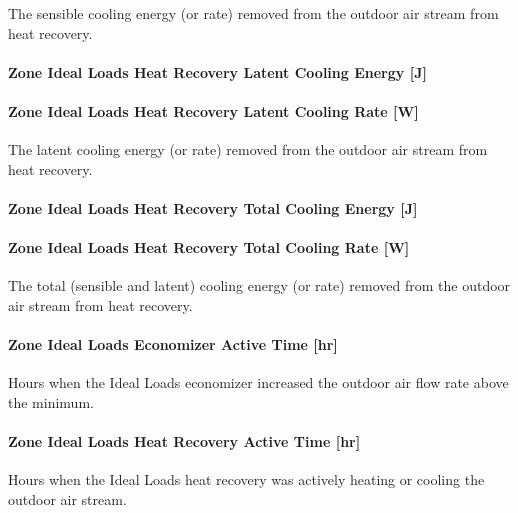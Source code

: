 The sensible cooling energy (or rate) removed from the outdoor air stream from heat recovery.

\paragraph{Zone Ideal Loads Heat Recovery Latent Cooling Energy {[}J{]}}\label{zone-ideal-loads-heat-recovery-latent-cooling-energy-j}

\paragraph{Zone Ideal Loads Heat Recovery Latent Cooling Rate {[}W{]}}\label{zone-ideal-loads-heat-recovery-latent-cooling-rate-w}

The latent cooling energy (or rate) removed from the outdoor air stream from heat recovery.

\paragraph{Zone Ideal Loads Heat Recovery Total Cooling Energy {[}J{]}}\label{zone-ideal-loads-heat-recovery-total-cooling-energy-j}

\paragraph{Zone Ideal Loads Heat Recovery Total Cooling Rate {[}W{]}}\label{zone-ideal-loads-heat-recovery-total-cooling-rate-w}

The total (sensible and latent) cooling energy (or rate) removed from the outdoor air stream from heat recovery.

\paragraph{Zone Ideal Loads Economizer Active Time {[}hr{]}}\label{zone-ideal-loads-economizer-active-time-hr}

Hours when the Ideal Loads economizer increased the outdoor air flow rate above the minimum.

\paragraph{Zone Ideal Loads Heat Recovery Active Time {[}hr{]}}\label{zone-ideal-loads-heat-recovery-active-time-hr}

Hours when the Ideal Loads heat recovery was actively heating or cooling the outdoor air stream.

